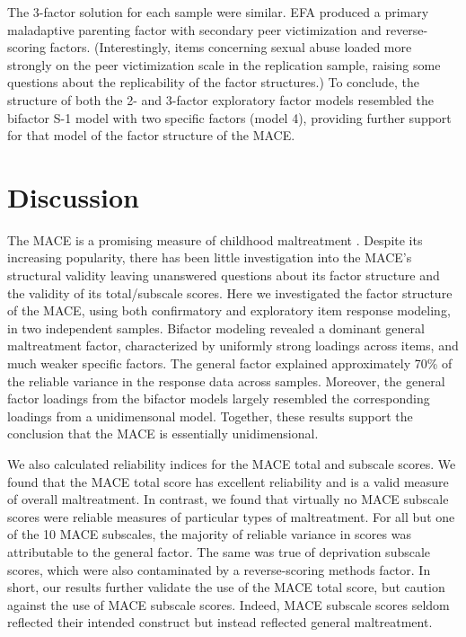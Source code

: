\documentclass[letterpaper,man,natbib,floatsintext,longtable]{apa6}
\begin{document}
The 3-factor solution for each sample were similar. EFA produced a primary maladaptive parenting factor with secondary peer victimization and reverse-scoring factors. (Interestingly, items concerning sexual abuse loaded more strongly on the peer victimization scale in the replication sample, raising some questions about the replicability of the factor structures.) To conclude, the structure of both the 2- and 3-factor exploratory factor models resembled the bifactor S-1 model with two specific factors (model 4), providing further support for that model of the factor structure of the MACE. 

\section{Discussion}

The MACE is a promising measure of childhood maltreatment \citep{georgieva2022systematic}. Despite its increasing popularity, there has been little investigation into the MACE's structural validity \citep{saini2019systematic} leaving unanswered questions about its factor structure and the validity of its total/subscale scores. Here we investigated the factor structure of the MACE, using both confirmatory and exploratory item response modeling, in two independent samples. Bifactor modeling revealed a dominant general maltreatment factor, characterized by uniformly strong loadings across items, and much weaker specific factors. The general factor explained approximately 70\% of the reliable variance in the response data across samples. Moreover, the general factor loadings from the bifactor models largely resembled the corresponding loadings from a unidimensonal model. Together, these results support the conclusion that the MACE is essentially unidimensional. 

We also calculated reliability indices for the MACE total and subscale scores. We found that the MACE total score has excellent reliability and is a valid measure of overall maltreatment. In contrast, we found that virtually no MACE subscale scores were reliable measures of particular types of maltreatment. For all but one of the 10 MACE subscales, the majority of reliable variance in scores was attributable to the general factor. The same was true of deprivation subscale scores, which were also contaminated by a reverse-scoring methods factor. In short, our results further validate the use of the MACE total score, but caution against the use of MACE subscale scores. Indeed, MACE subscale scores seldom reflected their intended construct but instead reflected general maltreatment.
\end{document}
